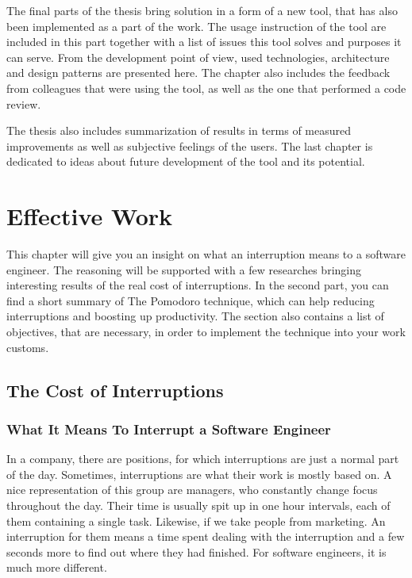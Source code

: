 \documentclass[11pt,singleside]{myfithesis2}
\begin{document}
The final parts of the thesis bring solution in a form of a new tool, that has also been implemented as a part of the work. The usage instruction of the tool are included in this part together with a list of issues this tool solves and purposes it can serve. From the development point of view, used technologies, architecture and design patterns are presented here. The chapter also includes the feedback from colleagues that were using the tool, as well as the one that performed a code review.

The thesis also includes summarization of results in terms of measured improvements as well as subjective feelings of the users. The last chapter is dedicated to ideas about future development of the tool and its potential.










\chapter{Effective Work}

This chapter will give you an insight on what an interruption means to a software engineer. The reasoning will be supported with a few researches bringing interesting results of the real cost of interruptions. In the second part, you can find a short summary of The Pomodoro technique, which can help reducing interruptions and boosting up productivity. The section also contains a list of objectives, that are necessary, in order to implement the technique into your work customs.

	\section{The Cost of Interruptions}

		\subsection{What It Means To Interrupt a Software Engineer}
In a company, there are positions, for which interruptions are just a normal part of the day. Sometimes, interruptions are what their work is mostly based on. A nice representation of this group are managers, who constantly change focus throughout the day. Their time is usually spit up in one hour intervals, each of them containing a single task. Likewise, if we take people from marketing. An interruption for them means a time spent dealing with the interruption and a few seconds more to find out where they had finished. For software engineers, it is much more different.
\end{document}
